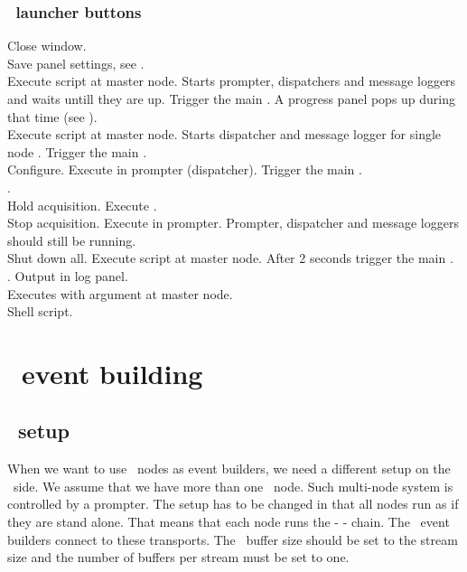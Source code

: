 {\subsubsection[MBS launcher buttons]{\mbs\ launcher buttons}
 Close window.\\
 Save panel settings, see .\\
  Execute script  at master node.
Starts prompter, dispatchers and message loggers and waits untill they are up.
Trigger the main .
A progress panel pops up during that time (see ).\\
 Execute script  at master node.
Starts dispatcher and message logger for single node \mbs.
Trigger the main .\\
 Configure. Execute  in prompter (dispatcher).
Trigger the main .\\
 .\\
 Hold acquisition. Execute .\\
 Stop acquisition. Execute  in prompter.
Prompter, dispatcher and message loggers should still be running.\\
 Shut down all. Execute script  at master node.
After 2 seconds trigger the main .\\
 . Output in log panel.\\
 Executes  with argument  at master node.\\
 Shell script.

\section[DABC event building]{\dabc\ event building}
\subsection[MBS setup]{\mbs\ setup}
When we want to use \dabc\ nodes as event builders, we need a different
setup on the \mbs\ side. We assume that we have more than one
\mbs\ node. Such multi-node system is controlled by a prompter.
The setup has to be changed in that all nodes run as if they are stand alone.
That means that each node runs the  -  - 
chain. The \dabc\ event builders connect to these transports.
The \mbs\ buffer size should be set to the stream size and the number of buffers per
stream must be set to one.
}
